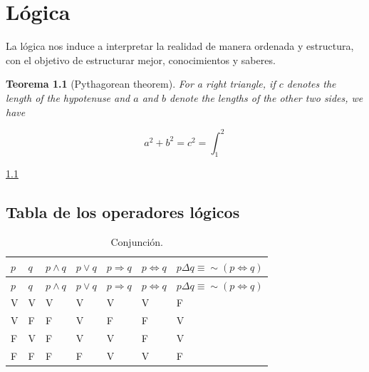 \documentclass[
  16pt,
]{krantz}
\newtheorem{theorem}{Teorema}[chapter]
\theoremstyle{definition}
\theoremstyle{definition}
\theoremstyle{definition}
\theoremstyle{definition}
\theoremstyle{remark}
\begin{document}
\mainmatter

\hypertarget{luxf3gica}{%
\chapter{Lógica}\label{luxf3gica}}

La lógica nos induce a interpretar la realidad de manera ordenada y estructura, con el objetivo de estructurar mejor, conocimientos y saberes.

\begin{theorem}[Pythagorean theorem]
\protect\hypertarget{thm:pyth}{}\label{thm:pyth}For a right triangle, if \(c\) denotes the length of the hypotenuse
and \(a\) and \(b\) denote the lengths of the other two sides, we have

\[a^2 + b^2 = c^2=\int_1^2\]
\end{theorem}

\ref{thm:pyth}

\hypertarget{tabla-de-los-operadores-luxf3gicos}{%
\section{Tabla de los operadores lógicos}\label{tabla-de-los-operadores-luxf3gicos}}

\begin{longtable}[]{@{}
  >{\raggedright\arraybackslash}p{}
  >{\raggedright\arraybackslash}p{}
  >{\raggedleft\arraybackslash}p{}
  >{\raggedleft\arraybackslash}p{}
  >{\raggedleft\arraybackslash}p{}
  >{\raggedleft\arraybackslash}p{}
  >{\raggedleft\arraybackslash}p{}@{}}
\caption{\label{tab:ww} Conjunción.}\tabularnewline
\toprule
\(p\) & \(q\) & \(p\wedge q\) & \(p\vee q\) & \(p\Longrightarrow q\) & \(p\Longleftrightarrow q\) & \(p\Delta q\equiv \sim (p\Longleftrightarrow q)\) \\
\midrule
\endfirsthead
\toprule
\(p\) & \(q\) & \(p\wedge q\) & \(p\vee q\) & \(p\Longrightarrow q\) & \(p\Longleftrightarrow q\) & \(p\Delta q\equiv \sim (p\Longleftrightarrow q)\) \\
\midrule
\endhead
V & V & V & V & V & V & F \\
V & F & F & V & F & F & V \\
F & V & F & V & V & F & V \\
F & F & F & F & V & V & F \\
\bottomrule
\end{longtable}
\end{document}
